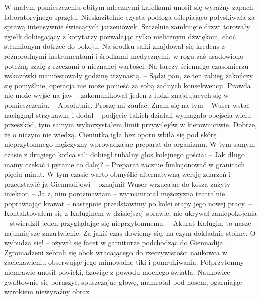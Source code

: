 \documentclass[../MAIN.tex]{subfiles}
\begin{document}
W małym pomieszczeniu obitym mlecznymi kafelkami unosił się wyraźny zapach laboratoryjnego sprzętu. Nieskazitelnie czysta podłoga oślepiająco połyskiwała za sprawą intensywnie świecących jarzeniówek. Szczelnie zamknięte drzwi torowały zgiełk dobiegający z korytarzy pozwalając tylko nielicznym dźwiękom, choć stłumionym dotrzeć do pokoju. Na środku salki znajdował się kredens z różnorodnymi instrumentami i środkami medycznymi, w rogu zaś usadowiono potężną szafę z rzeczami o nieznanej wartości. Na tarczy ściennego czasomierzu wskazówki manifestowały godzinę trzynastą. 
-- Sądzi pan, że ten zabieg zakończy się pomyślnie, operacja nie może ponieść za sobą żadnych konsekwencji. Prawda nie może wyjść na jaw -- zakomunikował jeden z ludzi znajdujących się w pomieszczeniu. 
-- Absolutnie. Proszę mi zaufać. Znam się na tym -- Wuser wstał naciągnął strzykawkę i dodał -- podjęcie takich działań wymagało obejścia wielu przeszkód, tym samym wykorzystałem limit przywilejów w kierownictwie. Dobrze, że o niczym nie wiedzą. 
Cieniutka igła bez oporu wbiła się pod skórę nieprzytomnego mężczyzny wprowadzając preparat do organizmu. W tym samym czasie z drugiego końca sali dobiegł tubalny głos kolejnego gościa: 
-- Jak długo mamy czekać i pytanie co dalej? 
-- Preparat zacznie funkcjonować w granicach pięciu minut. W tym czasie warto obmyślić alternatywną wersję zdarzeń i przedstawić ja Giennadijowi -- oznajmił Wuser wrzucając do kosza zużyty iniektor. 
-- Ja z, nim porozmawiam -- wymamrotał mężczyzna teatralnie poprawiając krawat -- następnie przedstawimy po kolei etapy jego nowej pracy. 
-- Kontaktowałem się z Kaługinem w dzisiejszej sprawie, nie ukrywał zaniepokojenia -- stwierdził jeden przyglądając się nieprzytomnemu. 
-- Akurat Kaługin, to nasze najmniejsze zmartwienie. Za jakiś czas dowiemy się, na czym dokładnie stoimy. O wybudza się! -- ożywił się facet w garniturze podchodząc do Giennadija. 
Zgromadzeni zebrali się obok wracającego do rzeczywistości naukowca w zaciekawieniu obserwując jego mimowolne tiki i pomrukiwania. Półprzytomny niemrawie unosił powieki, łzawiąc z powodu mocnego światła. Naukowiec gwałtownie się poruszył, spuszczając głowę, mamrotał pod nosem, ogarniając wzrokiem niewyraźny obraz. 
\end{document}
